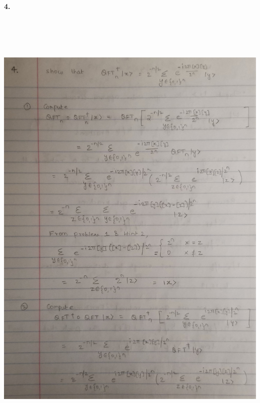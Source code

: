 \documentclass [12pt]{article}
\theoremstyle{definition}
\begin{document}
{\bf 4.} \\
\includegraphics[width=18cm, height=23cm]{I1}
\newpage
\end{document}
